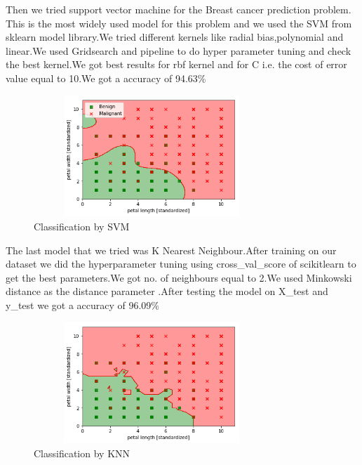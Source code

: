 \documentclass[conference,compsoc]{IEEEtran}
\begin{document}
\par
Then we tried support vector machine for the Breast cancer prediction problem. This is the most widely used model for this problem and we used the SVM from sklearn model library.We tried different kernels like radial bias,polynomial and linear.We used Gridsearch and pipeline to do hyper parameter tuning and check the best kernel.We got best results for rbf kernel and for C i.e. the cost of error value equal to 10.We got a accuracy of 94.63\%
\begin{figure}[H]
\centering
\includegraphics[width=3.5in,height=1.8in]{svm3.png}
\caption{Classification by SVM}
\label{fig_error}

\end{figure}  
\par
The last model that we tried was K Nearest Neighbour.After training on our dataset we did the hyperparameter tuning using  cross\_val\_score of scikitlearn to get the best parameters.We got no. of neighbours equal to 2.We used Minkowski distance as the distance parameter .After testing the model on  X\_test and y\_test we got a accuracy of 96.09\%
\begin{figure}[H]
\centering
\includegraphics[width=3.5in,height=1.8in]{knn2.png}
\caption{Classification by KNN}
\label{fig_error}

\end{figure}  
 
\end{document}
